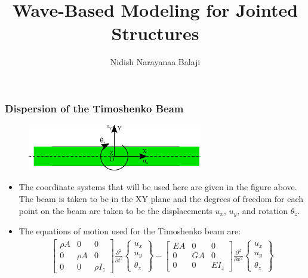 \documentclass[aspectratio=169]{beamertmd}
\title{Wave-Based Modeling for Jointed Structures}
\author{Nidish Narayanaa Balaji}
\begin{document}
\maketitle{}

\begin{frame}[allowframebreaks]
  \frametitle{Dispersion of the Timoshenko Beam}
  \vspace{-0.5cm}\begin{figure}[!h]
    \centering
    \includegraphics[height=2cm]{FIGS/CSYS}
  \end{figure}      
  \begin{itemize}
  \item The coordinate systems that will be used here are given in the
    figure above. The beam is taken to be in the XY plane and the
    degrees of freedom for each point on the beam are taken to be
    the displacements $u_x$, $u_y$, and rotation $\theta_z$.
  \item The equations of motion used for the Timoshenko beam are:
    {\tiny
      \begin{align*}
        \begin{bmatrix} \rho A & 0 & 0\\ 0 & \rho A & 0\\0 & 0 & \rho
          I_z \end{bmatrix} \frac{\partial^2}{\partial
                                                                 t^2}\begin{Bmatrix}
                                                                 u_x\\
                                                                 u_y\\\theta_z \end{Bmatrix}
        - \begin{bmatrix} EA & 0 & 0\\ 0 & GA & 0\\0 & 0 &
          EI_z \end{bmatrix} \frac{\partial^2}{\partial
                                                           x^2} \begin{Bmatrix}
                                                           u_x\\u_y\\\theta_z \end{Bmatrix}

\end{align*}}
\end{itemize}
\end{frame}
\end{document}
